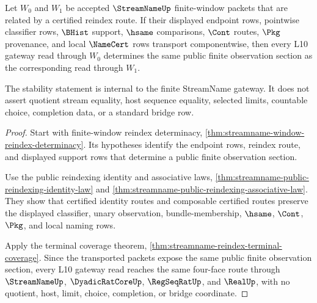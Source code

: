 \begin{theorem}
\label{thm:streamname-l10-gateway-window-reindex-stability}
Let $W_0$ and $W_1$ be accepted $\StreamNameUp$ finite-window packets that are related by a certified reindex route. If their displayed endpoint rows, pointwise classifier rows, $\BHist$ support, $\hsame$ comparisons, $\Cont$ routes, $\Pkg$ provenance, and local $\NameCert$ rows transport componentwise, then every L10 gateway read through $W_0$ determines the same public finite observation section as the corresponding read through $W_1$.

The stability statement is internal to the finite StreamName gateway. It does not assert quotient stream equality, host sequence equality, selected limits, countable choice, completion data, or a standard bridge row.
\end{theorem}
\begin{proof}
Start with finite-window reindex determinacy, \autoref{thm:streamname-window-reindex-determinacy}. Its hypotheses identify the endpoint rows, reindex route, and displayed support rows that determine a public finite observation section.

Use the public reindexing identity and associative laws, \autoref{thm:streamname-public-reindexing-identity-law} and \autoref{thm:streamname-public-reindexing-associative-law}. They show that certified identity routes and composable certified routes preserve the displayed classifier, unary observation, bundle-membership, $\hsame$, $\Cont$, $\Pkg$, and local naming rows.

Apply the terminal coverage theorem, \autoref{thm:streamname-reindex-terminal-coverage}. Since the transported packets expose the same public finite observation section, every L10 gateway read reaches the same four-face route through $\StreamNameUp$, $\DyadicRatCoreUp$, $\RegSeqRatUp$, and $\RealUp$, with no quotient, host, limit, choice, completion, or bridge coordinate.
\end{proof}


